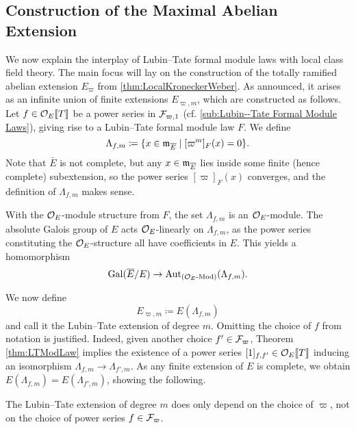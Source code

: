 \documentclass[../main.tex]{subfiles}
\begin{document}
\subsection{Construction of the Maximal Abelian Extension} %
\label{sub:Construction of the Maximal Abelian Extension}
We now explain the interplay of Lubin--Tate formal module laws with 
local class field theory. The main focus will lay on the construction of the
totally ramified abelian extension $E_\varpi$ from
\cref{thm:LocalKroneckerWeber}. As announced, it 
arises as an infinite union of finite extensions $E_{\varpi, m}$, which
are constructed as follows. Let $f \in \mathcal{O}_E\llbracket T \rrbracket$ be a power series
in $\mathcal{F}_{\varpi,1}$ (cf. \cref{sub:Lubin--Tate Formal Module Laws}), giving rise to a
Lubin--Tate formal module law $F$. We define
\begin{equation*}
  \Lambda_{f,m} \coloneqq \{x \in \mathfrak{m}_{\overline E} \mid [\varpi^m]_F(x) = 0\}.
\end{equation*}
Note that $\bar E$ is not complete, but any $x \in \mathfrak{m}_{\overline E}$ lies inside
some finite (hence
complete) subextension, so the power series $[\varpi]_F(x)$ converges, and the 
definition of $\Lambda_{f,m}$ makes sense.

With the $\mathcal{O}_E$-module structure from $F$, the set $\Lambda_{f,m}$ is an
$\mathcal{O}_E$-module. The absolute Galois group of $E$ acts $\mathcal{O}_E$-linearly on
$\Lambda_{f,m}$, as the power series constituting the $\mathcal{O}_E$-structure all
have coefficients in $E$. This yields a homomorphism 
\begin{equation} \label{eq:GaloisGroupToLambdaHom}
  \operatorname{Gal}(\overline E /E ) \to \operatorname{Aut}_{{({\mathcal{O}_E}\textnormal-\allowbreak\mathrm{Mod})}}(\Lambda_{f,m}).
\end{equation}

We now define 
\begin{equation*}
  E_{\varpi, m} \coloneq E(\Lambda_{f, m})
\end{equation*}
and call it the Lubin--Tate extension of degree $m$. 
Omitting the choice of $f$ from notation is justified. Indeed, given 
another choice $f' \in \mathcal{F}_\varpi$, Theorem \ref{thm:LTModLaw} implies the 
existence of a power series $[1]_{f,f'} \in \mathcal{O}_E\llbracket T \rrbracket$ inducing an
isomorphism $\Lambda_{f,m} \to \Lambda_{f',m}$. As any finite extension of $E$
is complete, we obtain $E(\Lambda_{f,m}) = E(\Lambda_{f',m})$, showing the following.
\begin{lem}\label{lem:FiniteLTExtensionIndepOfF}
  The Lubin--Tate extension of degree $m$ does only depend on the choice of $\varpi$,
  not on the choice of power series $f \in \mathcal{F}_\varpi$. 
\end{lem}
\end{document}
